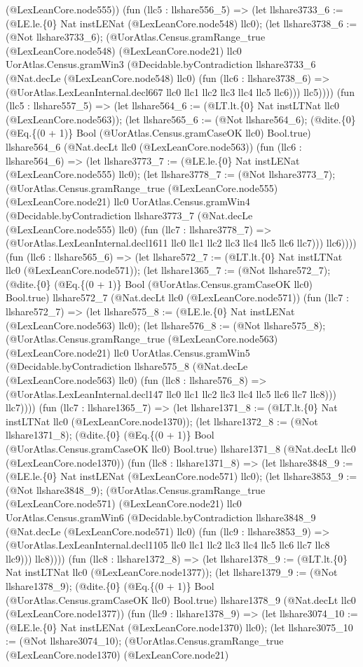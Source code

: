 \documentclass[11pt]{article}
\begin{document}
(@LexLeanCore.node555)) (fun (llc5 : llshare556\_5) => (let llshare3733\_6 := (@LE.le.\{0\} Nat instLENat (@LexLeanCore.node548) llc0); (let llshare3738\_6 := (@Not llshare3733\_6); (@UorAtlas.Census.gramRange\_true (@LexLeanCore.node548) (@LexLeanCore.node21) llc0 UorAtlas.Census.gramWin3 (@Decidable.byContradiction llshare3733\_6 (@Nat.decLe (@LexLeanCore.node548) llc0) (fun (llc6 : llshare3738\_6) => (@UorAtlas.LexLeanInternal.decl667 llc0 llc1 llc2 llc3 llc4 llc5 llc6))) llc5)))) (fun (llc5 : llshare557\_5) => (let llshare564\_6 := (@LT.lt.\{0\} Nat instLTNat llc0 (@LexLeanCore.node563)); (let llshare565\_6 := (@Not llshare564\_6); (@dite.\{0\} (@Eq.\{(0 + 1)\} Bool (@UorAtlas.Census.gramCaseOK llc0) Bool.true) llshare564\_6 (@Nat.decLt llc0 (@LexLeanCore.node563)) (fun (llc6 : llshare564\_6) => (let llshare3773\_7 := (@LE.le.\{0\} Nat instLENat (@LexLeanCore.node555) llc0); (let llshare3778\_7 := (@Not llshare3773\_7); (@UorAtlas.Census.gramRange\_true (@LexLeanCore.node555) (@LexLeanCore.node21) llc0 UorAtlas.Census.gramWin4 (@Decidable.byContradiction llshare3773\_7 (@Nat.decLe (@LexLeanCore.node555) llc0) (fun (llc7 : llshare3778\_7) => (@UorAtlas.LexLeanInternal.decl1611 llc0 llc1 llc2 llc3 llc4 llc5 llc6 llc7))) llc6)))) (fun (llc6 : llshare565\_6) => (let llshare572\_7 := (@LT.lt.\{0\} Nat instLTNat llc0 (@LexLeanCore.node571)); (let llshare1365\_7 := (@Not llshare572\_7); (@dite.\{0\} (@Eq.\{(0 + 1)\} Bool (@UorAtlas.Census.gramCaseOK llc0) Bool.true) llshare572\_7 (@Nat.decLt llc0 (@LexLeanCore.node571)) (fun (llc7 : llshare572\_7) => (let llshare575\_8 := (@LE.le.\{0\} Nat instLENat (@LexLeanCore.node563) llc0); (let llshare576\_8 := (@Not llshare575\_8); (@UorAtlas.Census.gramRange\_true (@LexLeanCore.node563) (@LexLeanCore.node21) llc0 UorAtlas.Census.gramWin5 (@Decidable.byContradiction llshare575\_8 (@Nat.decLe (@LexLeanCore.node563) llc0) (fun (llc8 : llshare576\_8) => (@UorAtlas.LexLeanInternal.decl147 llc0 llc1 llc2 llc3 llc4 llc5 llc6 llc7 llc8))) llc7)))) (fun (llc7 : llshare1365\_7) => (let llshare1371\_8 := (@LT.lt.\{0\} Nat instLTNat llc0 (@LexLeanCore.node1370)); (let llshare1372\_8 := (@Not llshare1371\_8); (@dite.\{0\} (@Eq.\{(0 + 1)\} Bool (@UorAtlas.Census.gramCaseOK llc0) Bool.true) llshare1371\_8 (@Nat.decLt llc0 (@LexLeanCore.node1370)) (fun (llc8 : llshare1371\_8) => (let llshare3848\_9 := (@LE.le.\{0\} Nat instLENat (@LexLeanCore.node571) llc0); (let llshare3853\_9 := (@Not llshare3848\_9); (@UorAtlas.Census.gramRange\_true (@LexLeanCore.node571) (@LexLeanCore.node21) llc0 UorAtlas.Census.gramWin6 (@Decidable.byContradiction llshare3848\_9 (@Nat.decLe (@LexLeanCore.node571) llc0) (fun (llc9 : llshare3853\_9) => (@UorAtlas.LexLeanInternal.decl1105 llc0 llc1 llc2 llc3 llc4 llc5 llc6 llc7 llc8 llc9))) llc8)))) (fun (llc8 : llshare1372\_8) => (let llshare1378\_9 := (@LT.lt.\{0\} Nat instLTNat llc0 (@LexLeanCore.node1377)); (let llshare1379\_9 := (@Not llshare1378\_9); (@dite.\{0\} (@Eq.\{(0 + 1)\} Bool (@UorAtlas.Census.gramCaseOK llc0) Bool.true) llshare1378\_9 (@Nat.decLt llc0 (@LexLeanCore.node1377)) (fun (llc9 : llshare1378\_9) => (let llshare3074\_10 := (@LE.le.\{0\} Nat instLENat (@LexLeanCore.node1370) llc0); (let llshare3075\_10 := (@Not llshare3074\_10); (@UorAtlas.Census.gramRange\_true (@LexLeanCore.node1370) (@LexLeanCore.node21) 
\end{document}
